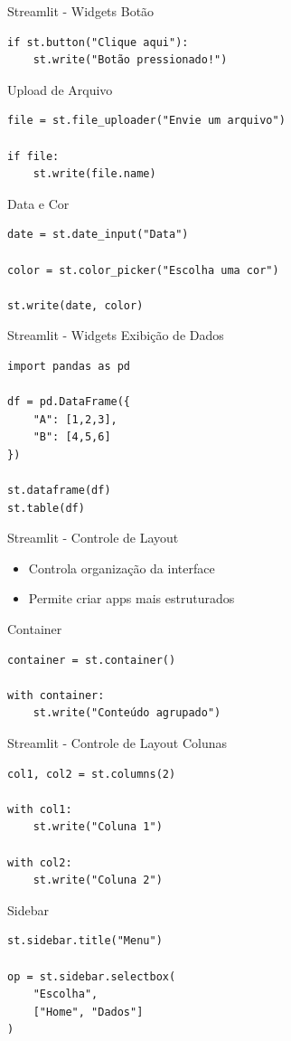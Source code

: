 \documentclass{beamer}
\begin{document}
\begin{frame}[fragile]{Streamlit - Widgets}
Botão
\begin{verbatim}
if st.button("Clique aqui"):
    st.write("Botão pressionado!")
\end{verbatim}

Upload de Arquivo
\begin{verbatim}
file = st.file_uploader("Envie um arquivo")

if file:
    st.write(file.name)
\end{verbatim}


Data e Cor
\begin{verbatim}
date = st.date_input("Data")

color = st.color_picker("Escolha uma cor")

st.write(date, color)
\end{verbatim}

\end{frame}

\begin{frame}[fragile]{Streamlit - Widgets}
Exibição de Dados
\begin{verbatim}
import pandas as pd

df = pd.DataFrame({
    "A": [1,2,3],
    "B": [4,5,6]
})

st.dataframe(df)
st.table(df)
\end{verbatim}

\end{frame}

\begin{frame}[fragile]{Streamlit - Controle de Layout}
\begin{itemize}
    \item Controla organização da interface
    \item Permite criar apps mais estruturados
\end{itemize}

Container
\begin{verbatim}
container = st.container()

with container:
    st.write("Conteúdo agrupado")
\end{verbatim}
\end{frame}

\begin{frame}[fragile]{Streamlit - Controle de Layout}
Colunas
\begin{verbatim}
col1, col2 = st.columns(2)

with col1:
    st.write("Coluna 1")

with col2:
    st.write("Coluna 2")
\end{verbatim}

Sidebar
\begin{verbatim}
st.sidebar.title("Menu")

op = st.sidebar.selectbox(
    "Escolha",
    ["Home", "Dados"]
)
\end{verbatim}

\end{frame}
\end{document}
